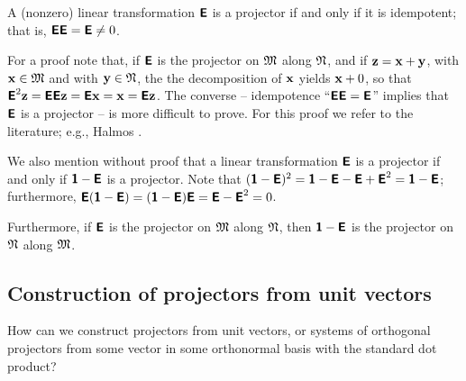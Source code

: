 A (nonzero) linear transformation
$\textsf{\textbf{E}}$ is a projector if and only if
it is idempotent; that is,
$\textsf{\textbf{E}}\textsf{\textbf{E}}=\textsf{\textbf{E}}\neq 0$.

{\color{OliveGreen}
\bproof
For a proof note that, if $\textsf{\textbf{E}}$  is the projector
on ${\frak M}$
along ${\frak N}$,
and if
$
{\bf z}
=
{\bf x}
+
{\bf y}
$, with
${\bf x} \in {\frak M}$
and with
${\bf y} \in {\frak N}$,
the the decomposition of ${\bf x}$ yields
${\bf x}+0$, so that
$\textsf{\textbf{E}}^2{\bf z}=\textsf{\textbf{E}}\textsf{\textbf{E}}{\bf z}=\textsf{\textbf{E}}{\bf x}
={\bf x}=\textsf{\textbf{E}}{\bf z}$.
The converse --
idempotence
``$\textsf{\textbf{E}}\textsf{\textbf{E}}=\textsf{\textbf{E}}$''
implies that $\textsf{\textbf{E}}$ is a projector -- is more difficult to prove.
For this proof we refer to the literature; e.g., Halmos \cite{halmos-vs}.
\eproof
}

We also mention without proof that a linear transformation
$\textsf{\textbf{E}}$ is a projector if and only if
$\textsf{\textbf{1}}-\textsf{\textbf{E}}$ is a projector.
Note that $(\textsf{\textbf{1}}-\textsf{\textbf{E}})^2
=\textsf{\textbf{1}}-\textsf{\textbf{E}}-\textsf{\textbf{E}}+ \textsf{\textbf{E}}^2
=\textsf{\textbf{1}}-\textsf{\textbf{E}}$;
furthermore,
$
\textsf{\textbf{E}}(\textsf{\textbf{1}}-\textsf{\textbf{E}})=
(\textsf{\textbf{1}}-\textsf{\textbf{E}})\textsf{\textbf{E}}=
\textsf{\textbf{E}}- \textsf{\textbf{E}}^2=0
$.


Furthermore, if $\textsf{\textbf{E}}$  is the projector
on ${\frak M}$
along ${\frak N}$,
then
 $\textsf{\textbf{1}}-\textsf{\textbf{E}}$ is the projector
on ${\frak N}$
along ${\frak M}$.




\subsection{Construction of projectors from unit vectors}

How can we construct projectors from unit vectors, or systems of orthogonal projectors from some vector in some orthonormal basis
with the standard dot product?

